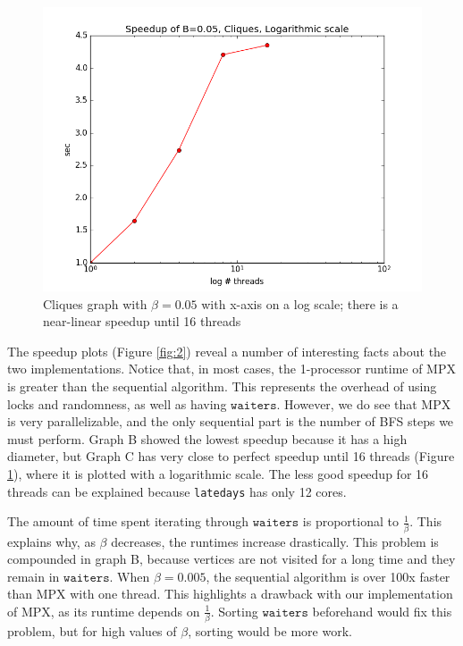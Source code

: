 \documentclass[11pt]{scrartcl}
\theoremstyle{plain}
\theoremstyle{definition}
\theoremstyle{remark}
\newcommand{\waiters}{\texttt{waiters}}
\begin{document}
\begin{figure}
\begin{center}
\includegraphics[scale=0.5]{Log_scale.png}
\end{center}
\caption{Cliques graph with $\beta=0.05$ with x-axis on a log scale; there is a near-linear speedup until 16 threads}
\label{fig:3}
\end{figure}
The speedup plots (Figure \ref{fig:2}) reveal a number of interesting facts about the two implementations. Notice that, in most cases, the 1-processor runtime of MPX is greater than the sequential algorithm. This represents the overhead of using locks and randomness, as well as having $\waiters$. However, we do see that MPX is very parallelizable, and the only sequential part is the number of BFS steps we must perform. Graph B showed the lowest speedup because it has a high diameter, but Graph C has very close to perfect speedup until 16 threads (Figure \ref{fig:3}), where it is plotted with a logarithmic scale. The less good speedup for 16 threads can be explained because \texttt{latedays} has only 12 cores. \par

The amount of time spent iterating through $\waiters$ is proportional to $\frac{1}{\beta}$. This explains why, as $\beta$ decreases, the runtimes increase drastically.  This problem is compounded in graph B, because vertices are not visited for a long time and they remain in $\waiters$. When $\beta=0.005$, the sequential algorithm is over 100x faster than MPX with one thread. This highlights a drawback with our implementation of MPX, as its runtime depends on $\frac{1}{\beta}$. Sorting $\waiters$ beforehand would fix this problem, but for high values of $\beta$, sorting would be more work. \par
\end{document}
